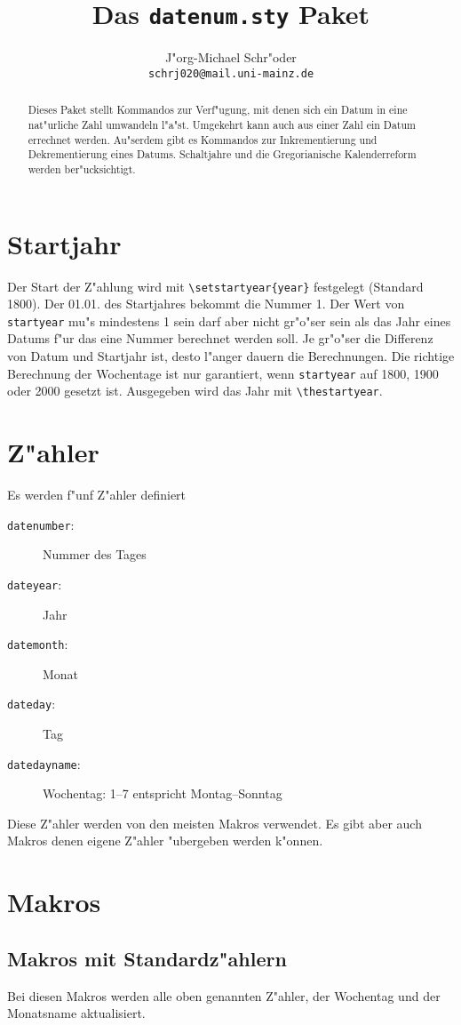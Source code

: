 \documentclass[a4paper,draft]{article}
\title{Das {\tt datenum.sty} Paket \fileversion}
\author{J"org-Michael Schr"oder\\{\small\texttt{schrj020@mail.uni-mainz.de}}}
\date{\filedate}
\begin{document}
\maketitle
\begin{abstract}
Dieses Paket stellt Kommandos zur Verf"ugung, mit denen sich ein Datum in eine nat"urliche Zahl umwandeln l"a"st. Umgekehrt kann auch aus einer Zahl ein Datum errechnet werden. Au"serdem gibt es Kommandos zur Inkrementierung und Dekrementierung eines Datums. Schaltjahre und die Gregorianische Kalenderreform werden ber"ucksichtigt.
\end{abstract}

\tableofcontents
\section{Startjahr}
Der Start der Z"ahlung wird mit \verb+\setstartyear{year}+ festgelegt (Standard 1800).
Der 01.01. des Startjahres bekommt die Nummer 1. Der Wert von \texttt{startyear} mu"s mindestens 1 sein darf aber nicht gr"o"ser sein als das Jahr eines Datums f"ur das eine Nummer berechnet werden soll. Je gr"o"ser die Differenz von Datum und Startjahr ist, desto l"anger dauern die Berechnungen. Die richtige Berechnung der Wochentage ist nur garantiert, wenn  \texttt{startyear} auf 1800, 1900 oder 2000 gesetzt ist. Ausgegeben wird das Jahr mit \verb+\thestartyear+.
\section{Z"ahler}
Es werden f"unf Z"ahler definiert
\begin{description}
\item[\texttt{datenumber}:] Nummer des Tages
\item[\texttt{dateyear}:] Jahr
\item[\texttt{datemonth}:] Monat
\item[\texttt{dateday}:] Tag
\item[\texttt{datedayname}:] Wochentag: 1--7 entspricht Montag--Sonntag
\end{description}
Diese Z"ahler werden von den meisten Makros verwendet. Es gibt aber auch Makros denen eigene Z"ahler "ubergeben werden k"onnen.
\section{Makros}
\subsection{Makros mit Standardz"ahlern\label{macro}}
Bei diesen Makros werden alle oben genannten Z"ahler, der Wochentag und der Monatsname aktualisiert.
\end{document}
